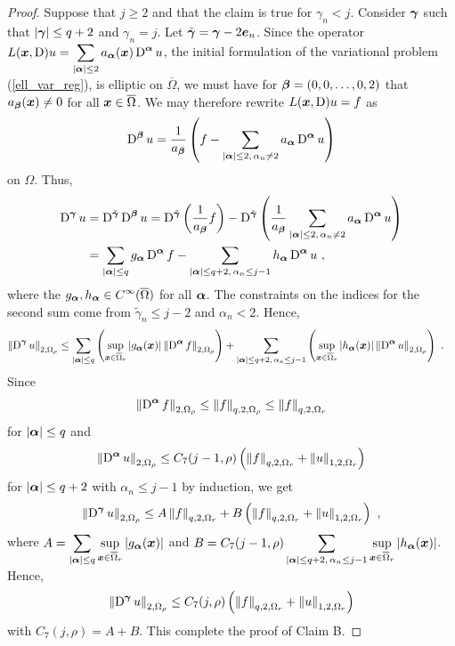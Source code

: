 \begin{proof}
Suppose that $j\geq 2$ and that the claim is true for $\gamma_n<j$.
Consider ${\bm{\gamma}}$ such that $|{\bm{\gamma}}| \leq q+2$ and
$\gamma_n = j$.  Let $\tilde{{\bm{\gamma}}} = {\bm{\gamma}} - 2 {\bm{e}}_n$.
Since the operator
$\displaystyle
L({\bm{x}},\operatorname{D})u = \sum_{|{\bm{\alpha}}|\leq 2} a_{{\bm{\alpha}}}({\bm{x}})
\operatorname{D}^{{\bm{\alpha}}} u$,
the initial formulation of the variational problem
(\ref{ell_var_reg}), is elliptic on $\overline{\Omega}$, we must have
for ${\bm{\beta}} = (0,0,\ldots,0,2)$ that
$a_{{\bm{\beta}}}({\bm{x}}) \neq 0$ for all ${\bm{x}} \in \overline{\Omega}$.
We may therefore rewrite $L({\bm{x}},\operatorname{D})u = f$ as
\[
\operatorname{D}^{{\bm{\beta}}} u = \frac{1}{a_{{\bm{\beta}}}} \left( f -
\sum_{|{\bm{\alpha}}|\leq 2,\, \alpha_n\neq 2} a_{{\bm{\alpha}}}
\operatorname{D}^{{\bm{\alpha}}} u \right)
\]
on $\Omega$.  Thus,
\begin{align*}
\operatorname{D}^{{\bm{\gamma}}} u &= \operatorname{D}^{\tilde{{\bm{\gamma}}}} \operatorname{D}^{{\bm{\beta}}} u
= \operatorname{D}^{\tilde{{\bm{\gamma}}}}\left(
\frac{1}{a_{{\bm{\beta}}}} f \right) - \operatorname{D}^{\tilde{{\bm{\gamma}}}}
\left( \frac{1}{a_{{\bm{\beta}}}}
\sum_{|{\bm{\alpha}}|\leq 2,\, \alpha_n\neq 2} a_{{\bm{\alpha}}}
\operatorname{D}^{{\bm{\alpha}}} u \right) \\
&= \sum_{|{\bm{\alpha}}|\leq q} g_{{\bm{\alpha}}} \operatorname{D}^{{\bm{\alpha}}} f
- \sum_{|{\bm{\alpha}}|\leq q+2,\, \alpha_n\leq j-1} h_{{\bm{\alpha}}}
\operatorname{D}^{{\bm{\alpha}}} u \ ,
\end{align*}
where the $\displaystyle g_{{\bm{\alpha}}}, h_{{\bm{\alpha}}}
\in C^\infty(\overline{\Omega})$
for all ${\bm{\alpha}}$.  The constraints on the indices for the second sum come
from $\tilde{\gamma}_n \leq j-2$ and $\alpha_n <2$.  Hence,
\begin{align*}
\left\| \operatorname{D}^{{\bm{\gamma}}} u \right\|_{2,\Omega_\rho}
&\leq \sum_{|{\bm{\alpha}}|\leq q} \left(
\sup_{{\bm{x}}\in \overline{\Omega}_r} \left| g_{{\bm{\alpha}}}({\bm{x}}) \right|
\left\| \operatorname{D}^{{\bm{\alpha}}} f \right\|_{2,\Omega_\rho}\right)
+ \sum_{|{\bm{\alpha}}|\leq q+2,\, \alpha_n\leq j-1} \left(
\sup_{{\bm{x}}\in \overline{\Omega}_r} \left| h_{{\bm{\alpha}}}({\bm{x}}) \right|
\left\| \operatorname{D}^{{\bm{\alpha}}}u \right\|_{2,\Omega_\rho} \right) \ .
\end{align*}
Since
\[
\left\| \operatorname{D}^{{\bm{\alpha}}} f \right\|_{2,\Omega_\rho} \leq
\left\| f \right\|_{q,2,\Omega_\rho} \leq
\left\| f \right\|_{q,2,\Omega_r}
\]
for $|{\bm{\alpha}}|\leq q$ and
\[
\left\| \operatorname{D}^{{\bm{\alpha}}} u \right\|_{2,\Omega_\rho} \leq
C_7(j-1,\rho) \left(
\left\|f\right\|_{q,2,\Omega_r} + \left\|u\right\|_{1,2,\Omega_r} \right)
\]
for $|{\bm{\alpha}}|\leq q+2$ with $\alpha_n\leq j-1$ by induction, we get
\[
\left\| \operatorname{D}^{{\bm{\gamma}}} u \right\|_{2,\Omega_\rho}
\leq A \left\| f \right\|_{q,2,\Omega_r} +
B \left( \left\|f\right\|_{q,2,\Omega_r} +
\left\|u\right\|_{1,2,\Omega_r} \right) \ ,
\]
where
$\displaystyle A = \sum_{|{\bm{\alpha}}|\leq q}
\sup_{{\bm{x}}\in \overline{\Omega}_r} \left| g_{{\bm{\alpha}}}({\bm{x}}) \right|$
and
$\displaystyle B = C_7(j-1,\rho) \sum_{|{\bm{\alpha}}|\leq q+2,\, \alpha_n\leq j-1}
\sup_{{\bm{x}}\in \overline{\Omega}_r} \left| h_{{\bm{\alpha}}}({\bm{x}}) \right|$.
Hence,
\[
\left\|\operatorname{D}^{{\bm{\gamma}}} u \right\|_{2,\Omega_\rho} \leq C_7(j,\rho) \left(
\left\|f\right\|_{q,2,\Omega_r} + \left\|u\right\|_{1,2,\Omega_r}
\right)
\]
with $C_7(j,\rho) = A+B$.  This complete the proof of Claim B.


\end{proof}
